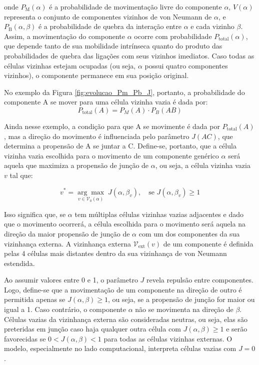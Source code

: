 \documentclass[12pt,oneside]{report}
\begin{document}
onde $P_\text{M}(\alpha)$ é a probabilidade de movimentação livre do componente $\alpha$, $V(\alpha)$ representa o conjunto de componentes vizinhos de von Neumann de $\alpha$, e $P_\text{B}(\alpha, \beta)$ é a probabilidade de quebra da interação entre $\alpha$ e cada vizinho $\beta$. Assim, a movimentação do componente $\alpha$ ocorre com probabilidade $P_\text{total}(\alpha)$, que depende tanto de sua mobilidade intrínseca quanto do produto das probabilidades de quebra das ligações com seus vizinhos imediatos. Caso todas as células vizinhas estejam ocupadas (ou seja, $\alpha$ possui quatro componentes vizinhos), o componente permanece em sua posição original.

No exemplo da Figura \ref{fig:evolucao_Pm_Pb_J}, portanto, a probabilidade do componente A se mover para uma célula vizinha vazia é dada por:
\begin{equation}
    P_\text{total}(A) = P_M(A) \cdot P_B(AB)
\end{equation}

Ainda nesse exemplo, a condição para que A se movimente é dada por $P_\text{total}(A)$, mas a direção do movimento é influenciada pelo parâmetro $J(AC)$, que determina a propensão de A se juntar a C. Define-se, portanto, que a célula vizinha vazia escolhida para o movimento de um componente genérico $\alpha$ será aquela que maximiza a propensão de junção de $\alpha$, ou seja, a célula vizinha vazia $v$ tal que:

\begin{equation}
    v^* = \underset{v \in \mathcal{V}_0(\alpha)}{\arg\max} \; J(\alpha, \beta_v), \quad \text{se } J(\alpha, \beta_v) \geq 1
\end{equation}

Isso significa que, se $\alpha$ tem múltiplas células vizinhas vazias adjacentes e dado que o movimento ocorrerá, a célula escolhida para o movimento será aquela na direção da maior propensão de junção de $\alpha$ com um dos componentes da sua vizinhança externa. A vizinhança externa $\mathcal{V}_\text{ext}(v)$ de um componente é definida pelas 4 células mais distantes dentro da sua vizinhança de von Neumann estendida.

Ao assumir valores entre 0 e 1, o parâmetro $J$ revela repulsão entre componentes. Logo, define-se que a movimentação de um componente na direção de outro é permitida apenas se $J(\alpha, \beta) \geq 1$, ou seja, se a propensão de junção for maior ou igual a 1. Caso contrário, o componente $\alpha$ não se movimenta na direção de $\beta$. Células vazias da vizinhança externa são consideradas neutras, ou seja, elas são preteridas em junção caso haja qualquer outra célula com $J(\alpha, \beta) \geq 1$ e serão favorecidas se $0 < J(\alpha, \beta) < 1$ para todas as células vizinhas externas. O modelo, especialmente no lado computacional, interpreta células vazias com $J = 0$.
\end{document}
